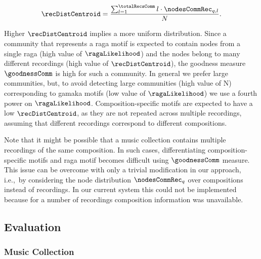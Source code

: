 {\begin{equation}
\recDistCentroid = \frac{\sum_{l=1}^{\totalRecsComm}l \cdot \nodesCommRec_{q,l}}{N}.
\end{equation}

Higher $\recDistCentroid$ implies a more uniform distribution. Since a community that represents a \gls{raga} motif is expected to contain nodes from a single \gls{raga} (high value of $\ragaLikelihood$) and the nodes belong to many different recordings (high value of $\recDistCentroid$), the goodness measure $\goodnessComm$ is high for such a community. In general we prefer large communities, but, to avoid detecting large communities (high value of N) corresponding to \gls{gamaka} motifs (low value of $\ragaLikelihood$) we use a fourth power on $\ragaLikelihood$. Composition-specific motifs are expected to have a low $\recDistCentroid$, as they are not repeated across multiple recordings, assuming that different recordings correspond to different compositions. 

Note that it might be possible that a music collection contains multiple recordings of the same composition. In such cases, differentiating composition-specific motifs and \gls{raga} motif becomes difficult using $\goodnessComm$ measure. This issue can be overcome with only a trivial modification in our approach, i.e.,~by considering the node distribution ${\boldsymbol{\nodesCommRec}_q}$ over compositions instead of recordings. In our current system this could not be implemented because for a number of recordings composition information was unavailable.



\subsection{Evaluation}
\label{sec:patterns_characterization_evaluation}

\subsubsection{Music Collection}
\label{sec:patterns_characterization_music_collection}

}
